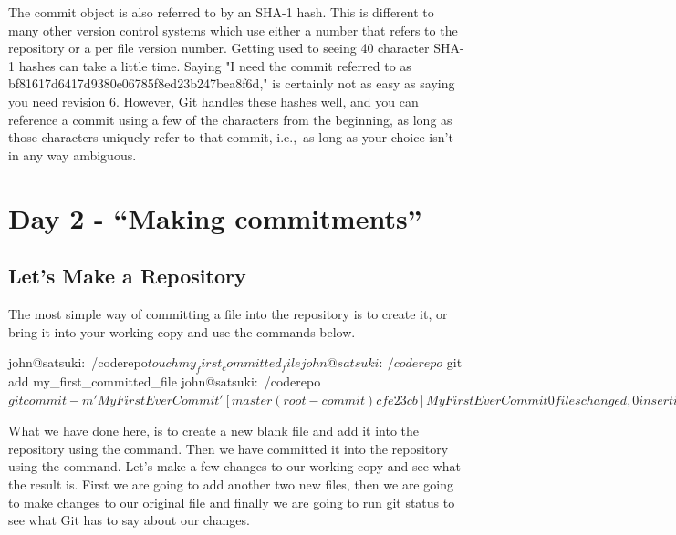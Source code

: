 The commit object is also referred to by an SHA-1 hash.
This is different to many other version control systems which use either a number that refers to the repository or a per file version number.
Getting used to seeing 40 character SHA-1 hashes can take a little time.
Saying "I need the commit referred to as bf81617d6417d9380e06785f8ed23b247bea8f6d," is certainly not as easy as saying you need revision 6.
However, Git handles these hashes well, and you can reference a commit using a few of the characters from the beginning, as long as those characters uniquely refer to that commit, i.e.,\ as long as your choice isn't in any way ambiguous.

\section{Day 2 - ``Making commitments''}
\subsection{Let's Make a Repository}

The most simple way of committing a file into the repository is to create it, or bring it into your working copy and use the commands below.

\begin{code}
john@satsuki:~/coderepo$ touch my_first_committed_file
john@satsuki:~/coderepo$ git add my_first_committed_file
john@satsuki:~/coderepo$ git commit -m 'My First Ever Commit'
[master (root-commit) cfe23cb] My First Ever Commit
 0 files changed, 0 insertions(+), 0 deletions(-)
 create mode 100644 my_first_committed_file
john@satsuki:~/coderepo$
\end{code}

What we have done here, is to create a new blank file and add it into the repository using the  command.
Then we have committed it into the repository using the  command.
Let's make a few changes to our working copy and see what the result is.
First we are going to add another two new files, then we are going to make changes to our original file and finally we are going to run git status to see what Git has to say about our changes.


